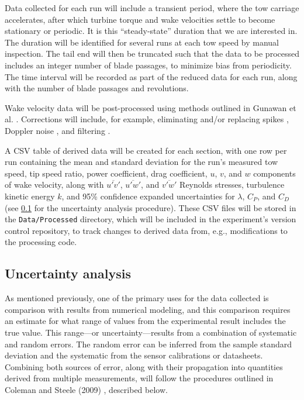 \documentclass[12pt,letterpaper]{scrreprt}
\begin{document}
Data collected for each run will include a transient period, where the tow
carriage accelerates, after which turbine torque and wake velocities settle to
become stationary or periodic. It is this ``steady-state'' duration that we are
interested in. The duration will be identified for several runs at each tow
speed by manual inspection. The tail end will then be truncated such that the
data to be processed includes an integer number of blade passages, to minimize
bias from periodicity. The time interval will be recorded as part of the reduced
data for each run, along with the number of blade passages and revolutions.

Wake velocity data will be post-processed using methods outlined in Gunawan et
al. \cite{Gunawan2011}. Corrections will include, for example, eliminating
and/or replacing spikes \cite{Goring2002}, Doppler noise \cite{Voulgaris1998},
and filtering \cite{Garcia2005}.

A CSV table of derived data will be created for each section, with one row per
run containing the mean and standard deviation for the run's measured tow speed,
tip speed ratio, power coefficient, drag coefficient, $u$, $v$, and $w$
components of wake velocity, along with $\overline{u'v'}$, $\overline{u'w'}$,
and $\overline{v'w'}$ Reynolds stresses, turbulence kinetic energy $k$, and 95\%
confidence expanded uncertainties for $\lambda$, $C_P$, and $C_D$ (see
\ref{heading-uncertainty} for the uncertainty analysis procedure). These CSV
files will be stored in the \texttt{Data/Processed} directory, which will be
included in the experiment's version control repository, to track changes to
derived data from, e.g., modifications to the processing code.

\subsection{Uncertainty analysis}\label{heading-uncertainty}

As mentioned previously, one of the primary uses for the data collected is
comparison with results from numerical modeling, and this comparison requires an
estimate for what range of values from the experimental result includes the true
value. This range---or uncertainty---results from a combination of systematic
and random errors. The random error can be inferred from the sample standard
deviation and the systematic from the sensor calibrations or datasheets.
Combining both sources of error, along with their propagation into quantities
derived from multiple measurements, will follow the procedures outlined in
Coleman and Steele (2009) \cite{ColemanSteele}, described below.
\end{document}
